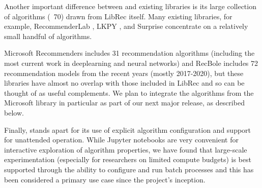 Another important difference between \libauto{} and existing libraries is its large collection of algorithms (~70) drawn from LibRec itself. Many existing libraries, for example, RecommenderLab \cite{hahsler2015recommenderlab}, LKPY \cite{LensKit2020}, and Surprise \cite{Hug2020} concentrate on a relatively small handful of algorithms.

Microsoft Recommenders \cite{MicrosoftRecommenders} includes 31 recommendation algorithms (including the most current work in deeplearning and neural networks) and RecBole \cite{recbole} includes 72 recommendation models from the recent years (mostly 2017-2020), but these libraries have almost no overlap with those included in LibRec and so can be thought of as useful complements. We plan to integrate the algorithms from the Microsoft library in particular as part of our next major release, as described below.


Finally, \libauto{} stands apart for its use of explicit algorithm configuration and support for unattended operation. While Jupyter notebooks are very convenient for interactive exploration of algorithm properties, we have found that large-scale experimentation (especially for researchers on limited compute budgets) is best supported through the ability to configure and run batch processes and this has been considered a primary use case since the project's inception.


